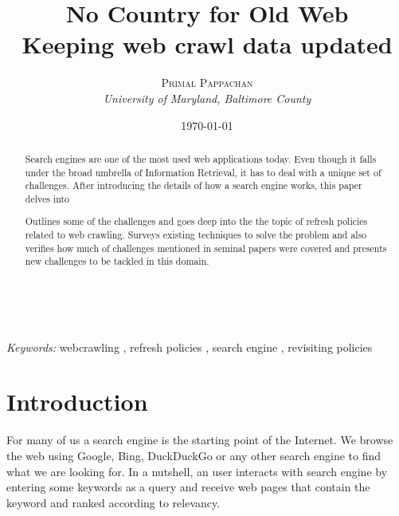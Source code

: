 \documentclass[a4paper, 11pt]{article} %
\title{\textbf{No Country for Old Web}\\ %
Keeping web crawl data updated} %
\author{\textsc{Primal Pappachan} %
\\{\textit{University of Maryland, Baltimore County}}} %
\date{\today} %
\makeatletter
\renewcommand{\maketitle}{ %
\begin{flushright} %
{\LARGE\@title} %

\vspace{50pt} %

{\large\@author} %
\\\@date %

\vspace{40pt} %
\end{flushright}
}
\makeatother
\begin{document}
\maketitle %



\begin{abstract}

Search engines are one of the most used web applications today. Even though it falls under the broad umbrella of Information Retrieval, it has to deal with a unique set of challenges. After introducing the details of how a search engine works, this paper delves into           

Outlines some of the challenges and goes deep into the the topic of refresh policies related to web crawling. Surveys existing techniques to solve the problem and also verifies how much of challenges mentioned in seminal papers were covered and presents new challenges to be tackled in this domain.

\end{abstract}

\hspace*{3,6mm}\textit{Keywords:} webcrawling , refresh policies , search engine , revisiting policies %

\vspace{30pt} %


\section*{Introduction}

For many of us a search engine is the starting point of the Internet. We browse the web using Google, Bing, DuckDuckGo or any other search engine to find what we are looking for. In a nutshell, an user interacts with search engine by entering some keywords as a query and receive web pages that contain the keyword and ranked according to relevancy. \\
\end{document}
